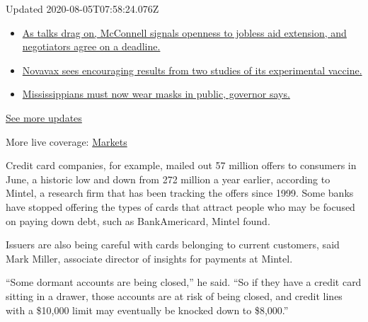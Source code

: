 Updated 2020-08-05T07:58:24.076Z

\begin{itemize}
\tightlist
\item
  \href{https://www.nytimes3xbfgragh.onion/2020/08/04/world/coronavirus-cases.html?action=click\&pgtype=Article\&state=default\&region=MAIN_CONTENT_1\&context=storylines_live_updates\#link-762df92}{As
  talks drag on, McConnell signals openness to jobless aid extension,
  and negotiators agree on a deadline.}
\item
  \href{https://www.nytimes3xbfgragh.onion/2020/08/04/world/coronavirus-cases.html?action=click\&pgtype=Article\&state=default\&region=MAIN_CONTENT_1\&context=storylines_live_updates\#link-1228a480}{Novavax
  sees encouraging results from two studies of its experimental
  vaccine.}
\item
  \href{https://www.nytimes3xbfgragh.onion/2020/08/04/world/coronavirus-cases.html?action=click\&pgtype=Article\&state=default\&region=MAIN_CONTENT_1\&context=storylines_live_updates\#link-794484ed}{Mississippians
  must now wear masks in public, governor says.}
\end{itemize}

\href{https://www.nytimes3xbfgragh.onion/2020/08/04/world/coronavirus-cases.html?action=click\&pgtype=Article\&state=default\&region=MAIN_CONTENT_1\&context=storylines_live_updates}{See
more updates}

More live coverage:
\href{https://www.nytimes3xbfgragh.onion/live/2020/08/04/business/stock-market-today-coronavirus?action=click\&pgtype=Article\&state=default\&region=MAIN_CONTENT_1\&context=storylines_live_updates}{Markets}

Credit card companies, for example, mailed out 57 million offers to
consumers in June, a historic low and down from 272 million a year
earlier, according to Mintel, a research firm that has been tracking the
offers since 1999. Some banks have stopped offering the types of cards
that attract people who may be focused on paying down debt, such as
BankAmericard, Mintel found.

Issuers are also being careful with cards belonging to current
customers, said Mark Miller, associate director of insights for payments
at Mintel.

``Some dormant accounts are being closed,'' he said. ``So if they have a
credit card sitting in a drawer, those accounts are at risk of being
closed, and credit lines with a \$10,000 limit may eventually be knocked
down to \$8,000.''

